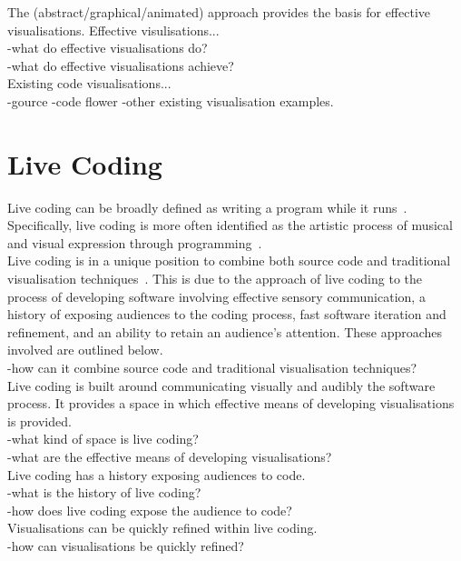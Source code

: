 The (abstract/graphical/animated) approach provides the basis for effective visualisations. Effective visulisations...\\
-what do effective visualisations do?\\
-what do effective visualisations achieve?\\

Existing code visualisations...\\
-gource \cite{Caudwell2010}
-code flower
-other existing visualisation examples.

\section{Live Coding}

Live coding can be broadly defined as writing a program while it runs~\cite{Ward2004}. Specifically, live coding is more often identified as the artistic process of musical and visual expression through programming~\cite{Collins2003}.\\

Live coding is in a unique position to combine both source code and traditional visualisation techniques~\cite{McLean2010a}. This is due to the approach of live coding to the process of developing software involving effective sensory communication, a history of exposing audiences to the coding process, fast software iteration and refinement, and an ability to retain an audience's attention. These approaches involved are outlined below.\\
-how can it combine source code and traditional visualisation techniques?\\

Live coding is built around communicating visually and audibly the software process. It provides a space in which effective means of developing visualisations is provided. \\
-what kind of space is live coding?\\
-what are the effective means of developing visualisations?\\

Live coding has a history exposing audiences to code.\\
-what is the history of live coding?\\
-how does live coding expose the audience to code?\\

Visualisations can be quickly refined within live coding.\\
-how can visualisations be quickly refined?\\

